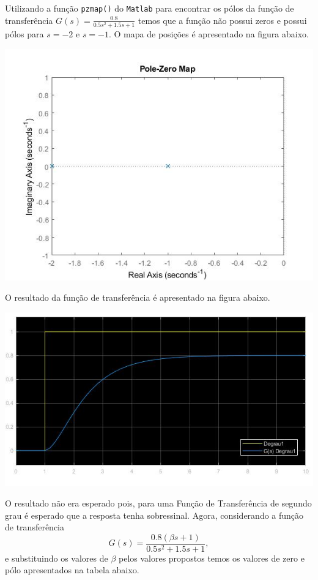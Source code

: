 \documentclass[
]{book}
\theoremstyle{definition}
\theoremstyle{definition}
\theoremstyle{definition}
\theoremstyle{remark}
\begin{document}
Utilizando a função \texttt{pzmap()} do \texttt{Matlab} para encontrar os pólos da função de transferência \(G(s) = \frac {0.8}{0.5s^2+1.5s+1}\) temos que a função não possui zeros e possui pólos para \(s = -2\) e \(s = -1\). O mapa de posições é apresentado na figura abaixo.

\includegraphics{Imagens/Lab2/prob4.jpg}

O resultado da função de transferência é apresentado na figura abaixo.

\includegraphics{imagens/Lab2/prob41.jpg}

O resultado não era esperado pois, para uma Função de Transferência de segundo grau é esperado que a resposta tenha sobressinal. Agora, considerando a função de transferência
\[
G(s) = \frac {0.8(\beta s+1)}{0.5s^2+1.5s+1},
\]
e substituindo os valores de \(\beta\) pelos valores propostos temos os valores de zero e pólo apresentados na tabela abaixo.
\end{document}
